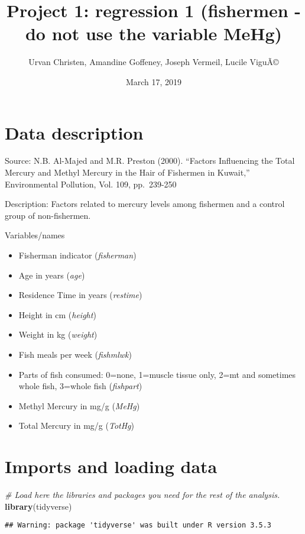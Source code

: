 \documentclass[12pt,]{article}
\title{Project 1: regression 1 (fishermen - do not use the variable MeHg)}
\author{Urvan Christen, Amandine Goffeney, Joseph Vermeil, Lucile ViguÃ©}
\date{March 17, 2019}
\newenvironment{Shaded}{\begin{snugshade}}{\end{snugshade}}
\newcommand{\KeywordTok}[1]{\textcolor[rgb]{0.13,0.29,0.53}{\textbf{#1}}}
\newcommand{\CommentTok}[1]{\textcolor[rgb]{0.56,0.35,0.01}{\textit{#1}}}
\newcommand{\NormalTok}[1]{#1}
\providecommand{\tightlist}{%
  \setlength{\itemsep}{0pt}\setlength{\parskip}{0pt}}
\begin{document}
\maketitle

\section{Data description}\label{data-description}

Source: N.B. Al-Majed and M.R. Preston (2000). ``Factors Influencing the
Total Mercury and Methyl Mercury in the Hair of Fishermen in Kuwait,''
Environmental Pollution, Vol. 109, pp.~239-250

Description: Factors related to mercury levels among fishermen and a
control group of non-fishermen.

Variables/names

\begin{itemize}
\tightlist
\item
  Fisherman indicator (\emph{fisherman})
\item
  Age in years (\emph{age})
\item
  Residence Time in years (\emph{restime})
\item
  Height in cm (\emph{height})
\item
  Weight in kg (\emph{weight})
\item
  Fish meals per week (\emph{fishmlwk})
\item
  Parts of fish consumed: 0=none, 1=muscle tissue only, 2=mt and
  sometimes whole fish, 3=whole fish (\emph{fishpart})
\item
  Methyl Mercury in mg/g (\emph{MeHg})
\item
  Total Mercury in mg/g (\emph{TotHg})
\end{itemize}

\section{Imports and loading data}\label{imports-and-loading-data}

\begin{Shaded}
\begin{Highlighting}[]
\CommentTok{# Load here the libraries and packages you need for the rest of the analysis.}
\KeywordTok{library}\NormalTok{(tidyverse)}
\end{Highlighting}
\end{Shaded}

\begin{verbatim}
## Warning: package 'tidyverse' was built under R version 3.5.3
\end{verbatim}
\end{document}
